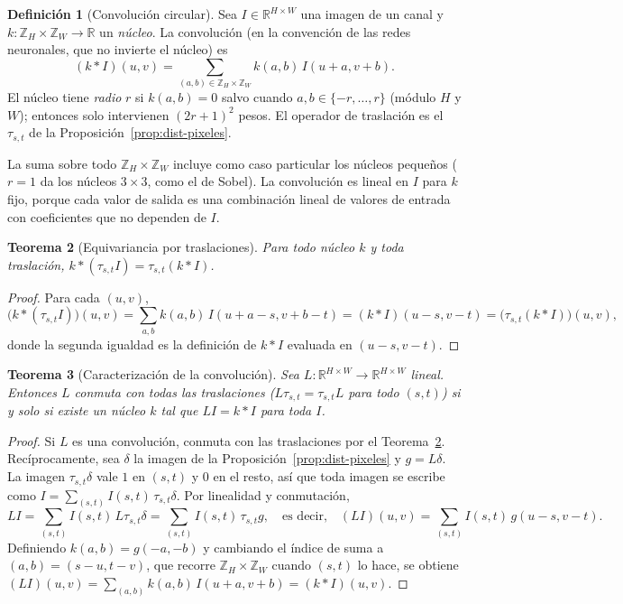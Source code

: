 \documentclass[11pt]{article}
\newtheorem{teorema}{Teorema}[section]
\theoremstyle{definition}
\newtheorem{definicion}[teorema]{Definición}
\theoremstyle{remark}
\newcommand{\R}{\mathbb{R}}
\begin{document}
\begin{definicion}[Convolución circular]\label{def:conv}
\noindent Sea $I\in\R^{H\times W}$ una imagen de un canal y $k:\mathbb Z_H\times\mathbb Z_W\to\R$ un \emph{núcleo}. La convolución (en la convención de las redes neuronales, que no invierte el núcleo) es
\[
(k*I)(u,v)=\sum_{(a,b)\in\mathbb Z_H\times\mathbb Z_W}k(a,b)\,I(u+a,v+b).
\]
El núcleo tiene \emph{radio} $r$ si $k(a,b)=0$ salvo cuando $a,b\in\{-r,\dots,r\}$ (módulo $H$ y $W$); entonces solo intervienen $(2r+1)^2$ pesos. El operador de traslación es el $\tau_{s,t}$ de la Proposición~\ref{prop:dist-pixeles}.
\end{definicion}

\noindent La suma sobre todo $\mathbb Z_H\times\mathbb Z_W$ incluye como caso particular los núcleos pequeños ($r=1$ da los núcleos $3\times3$, como el de Sobel). La convolución es lineal en $I$ para $k$ fijo, porque cada valor de salida es una combinación lineal de valores de entrada con coeficientes que no dependen de $I$.

\begin{teorema}[Equivariancia por traslaciones]\label{teo:equiv}
\noindent Para todo núcleo $k$ y toda traslación, $k*(\tau_{s,t}I)=\tau_{s,t}(k*I)$.
\end{teorema}
\begin{proof}
\noindent Para cada $(u,v)$,
\[
\big(k*(\tau_{s,t}I)\big)(u,v)=\sum_{a,b}k(a,b)\,I(u+a-s,v+b-t)=(k*I)(u-s,v-t)=\big(\tau_{s,t}(k*I)\big)(u,v),
\]
donde la segunda igualdad es la definición de $k*I$ evaluada en $(u-s,v-t)$.
\end{proof}

\begin{teorema}[Caracterización de la convolución]\label{teo:caract-conv}
\noindent Sea $L:\R^{H\times W}\to\R^{H\times W}$ lineal. Entonces $L$ conmuta con todas las traslaciones ($L\tau_{s,t}=\tau_{s,t}L$ para todo $(s,t)$) si y solo si existe un núcleo $k$ tal que $LI=k*I$ para toda $I$.
\end{teorema}
\begin{proof}
\noindent Si $L$ es una convolución, conmuta con las traslaciones por el Teorema~\ref{teo:equiv}. Recíprocamente, sea $\delta$ la imagen de la Proposición~\ref{prop:dist-pixeles} y $g=L\delta$. La imagen $\tau_{s,t}\delta$ vale $1$ en $(s,t)$ y $0$ en el resto, así que toda imagen se escribe como $I=\sum_{(s,t)}I(s,t)\,\tau_{s,t}\delta$. Por linealidad y conmutación,
\[
LI=\sum_{(s,t)}I(s,t)\,L\tau_{s,t}\delta=\sum_{(s,t)}I(s,t)\,\tau_{s,t}g,\quad\text{es decir,}\quad (LI)(u,v)=\sum_{(s,t)}I(s,t)\,g(u-s,v-t).
\]
Definiendo $k(a,b)=g(-a,-b)$ y cambiando el índice de suma a $(a,b)=(s-u,t-v)$, que recorre $\mathbb Z_H\times\mathbb Z_W$ cuando $(s,t)$ lo hace, se obtiene $(LI)(u,v)=\sum_{(a,b)}k(a,b)\,I(u+a,v+b)=(k*I)(u,v)$.
\end{proof}
\end{document}
